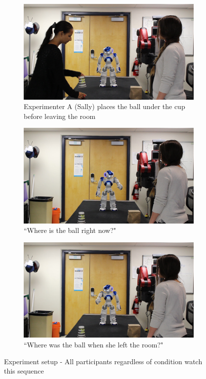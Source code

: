 \documentclass[letterpaper, 10 pt, conference]{ieeeconf}  %
\begin{document}
\begin{figure}[t]
\begin{center}
\begin{subfigure}{0.98\linewidth}
\centering
\includegraphics[width=0.9\linewidth]{cup.jpg}
\caption{Experimenter A (Sally) places the ball under the cup before leaving the room\label{fig:Task1}\vspace{0.3cm}}
\end{subfigure}
\begin{subfigure}{0.98\linewidth}
\centering
\includegraphics[width=0.9\linewidth]{where_is_it.jpg} 
\caption{``Where is the ball right now?"}
\label{fig:Task2}\vspace{0.3cm}
\end{subfigure}
\begin{subfigure}{0.98\linewidth}
\centering
\includegraphics[width=0.9\linewidth]{where_was_it.jpg}
\caption{``Where was the ball when she left the room?"}
\label{fig:Task3}
\end{subfigure}
\end{center}
\caption{Experiment setup - All participants regardless of condition watch this sequence}
\label{fig:image2}
\end{figure}
\end{document}
